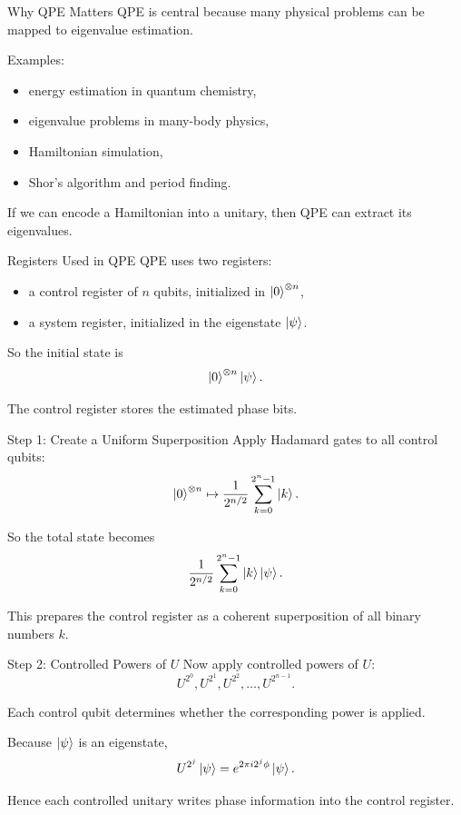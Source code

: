 \documentclass{beamer}
\begin{document}
\begin{frame}{Why QPE Matters}
QPE is central because many physical problems can be mapped to eigenvalue estimation.

Examples:
\begin{itemize}
\item energy estimation in quantum chemistry,
\item eigenvalue problems in many-body physics,
\item Hamiltonian simulation,
\item Shor's algorithm and period finding.
\end{itemize}

If we can encode a Hamiltonian into a unitary, then QPE can extract its eigenvalues.
\end{frame}

\begin{frame}{Registers Used in QPE}
QPE uses two registers:

\begin{itemize}
\item a control register of \(n\) qubits, initialized in \(\ket{0}^{\otimes n}\),
\item a system register, initialized in the eigenstate \(\ket{\psi}\).
\end{itemize}

So the initial state is
\[
\ket{0}^{\otimes n}\ket{\psi}.
\]

The control register stores the estimated phase bits.
\end{frame}

\begin{frame}{Step 1: Create a Uniform Superposition}
Apply Hadamard gates to all control qubits:
\[
\ket{0}^{\otimes n}
\mapsto
\frac{1}{2^{n/2}}
\sum_{k=0}^{2^n-1}\ket{k}.
\]

So the total state becomes
\[
\frac{1}{2^{n/2}}
\sum_{k=0}^{2^n-1}
\ket{k}\ket{\psi}.
\]

This prepares the control register as a coherent superposition of all binary numbers \(k\).
\end{frame}

\begin{frame}{Step 2: Controlled Powers of \(U\)}
Now apply controlled powers of \(U\):
\[
U^{2^0}, U^{2^1}, U^{2^2}, \dots, U^{2^{n-1}}.
\]

Each control qubit determines whether the corresponding power is applied.

Because \(\ket{\psi}\) is an eigenstate,
\[
U^{2^j}\ket{\psi} = e^{2\pi i 2^j \phi}\ket{\psi}.
\]

Hence each controlled unitary writes phase information into the control register.
\end{frame}
\end{document}
